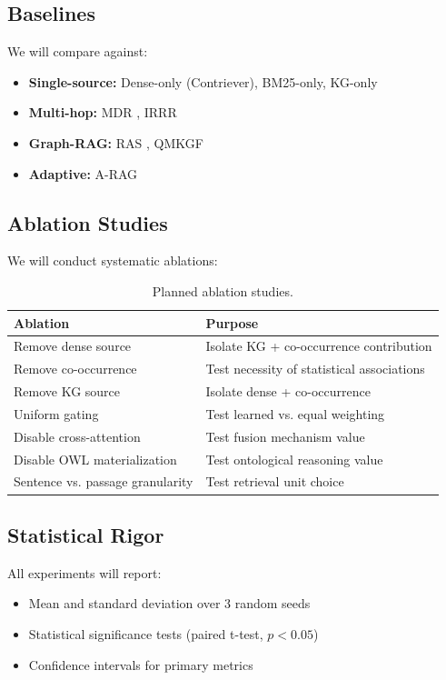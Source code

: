 \documentclass[11pt,a4paper]{article}
\begin{document}
\subsection{Baselines}

We will compare against:
\begin{itemize}
    \item \textbf{Single-source:} Dense-only (Contriever), BM25-only, KG-only
    \item \textbf{Multi-hop:} MDR \citep{xiong2021answering}, IRRR \citep{qi2021answering}
    \item \textbf{Graph-RAG:} RAS \citep{ras2024}, QMKGF \citep{qmkgf2024}
    \item \textbf{Adaptive:} A-RAG \citep{arag2024}
\end{itemize}

\subsection{Ablation Studies}

We will conduct systematic ablations:

\begin{table}[h]
\centering
\small
\begin{tabular}{ll}
\toprule
\textbf{Ablation} & \textbf{Purpose} \\
\midrule
Remove dense source & Isolate KG + co-occurrence contribution \\
Remove co-occurrence & Test necessity of statistical associations \\
Remove KG source & Isolate dense + co-occurrence \\
Uniform gating & Test learned vs. equal weighting \\
Disable cross-attention & Test fusion mechanism value \\
Disable OWL materialization & Test ontological reasoning value \\
Sentence vs. passage granularity & Test retrieval unit choice \\
\bottomrule
\end{tabular}
\caption{Planned ablation studies.}
\label{tab:ablations}
\end{table}

\subsection{Statistical Rigor}

All experiments will report:
\begin{itemize}
    \item Mean and standard deviation over 3 random seeds
    \item Statistical significance tests (paired t-test, $p < 0.05$)
    \item Confidence intervals for primary metrics
\end{itemize}
\end{document}
